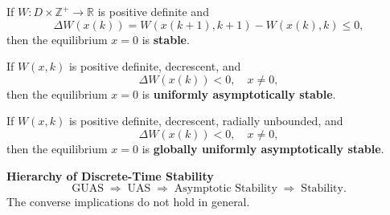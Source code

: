 \begin{theorem}
If $W:D \times \mathbb{Z}^+ \to \mathbb{R}$ is positive definite and
\begin{equation}
\Delta W(x(k)) = W(x(k+1),k+1) - W(x(k),k) \le 0,
\end{equation}
then the equilibrium $x=0$ is \textbf{stable}.
\end{theorem}

\begin{theorem}
If $W(x,k)$ is positive definite, decrescent, and
\begin{equation}
\Delta W(x(k)) < 0, \quad x\neq 0,
\end{equation}
then the equilibrium $x=0$ is \textbf{uniformly asymptotically stable}.
\end{theorem}

\begin{theorem}
If $W(x,k)$ is positive definite, decrescent, radially unbounded, and
\begin{equation}
\Delta W(x(k)) < 0, \quad x\neq 0,
\end{equation}
then the equilibrium $x=0$ is \textbf{globally uniformly asymptotically stable}.
\end{theorem}

\begin{remark}\textbf{Hierarchy of Discrete-Time Stability}
\begin{equation}
\text{GUAS} \;\Rightarrow\; \text{UAS} \;\Rightarrow\; \text{Asymptotic Stability} \;\Rightarrow\; \text{Stability}.
\end{equation}
The converse implications do not hold in general.
\end{remark}
